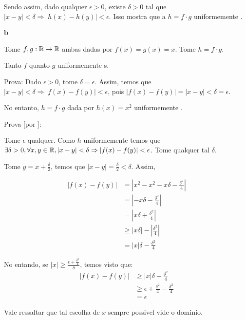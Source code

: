Sendo assim, dado qualquer $\epsilon > 0$, existe $\delta > 0$ tal que \mbox{$|x-y| < \delta \Rightarrow |h(x)-h(y)|<\epsilon$}. Isso mostra que a \funcao $h = f\cdot g$ \eh uniformemente \continua.

\textbf{b}

Tome $f,g:\mathbb{R}\rightarrow\mathbb{R}$ ambas dadas por $f(x) = g(x) = x$. Tome $h = f\cdot g$.

Tanto $f$ quanto $g$ \sao uniformemente \continua s.

Prova: Dado $\epsilon > 0$, tome $\delta = \epsilon$. Assim, temos que $|x - y| < \delta \Rightarrow |f(x) - f(y)| < \epsilon$, pois $|f(x) - f(y)| = |x - y| < \delta = \epsilon$.

No entanto, $h = f \cdot g$ dada por $h(x) = x^2$ \nao \eh uniformemente \continua.

Prova [por \contradicao]:

Tome $\epsilon$ qualquer. Como $h$ uniformemente \continua temos que $\exists \delta > 0, \forall x,y \in \mathbb{R}, |x-y| < \delta \Rightarrow |f(x)-f(y)| < \epsilon$. Tome qualquer tal $\delta$.

Tome $y = x + \frac{\delta}{2}$, temos que $|x-y| = \frac{\delta}{2} < \delta$. Assim, 

\begin{align*}
	|f(x) - f(y)| &= |x^2 - x^2 - x\delta - \frac{\delta^2}{4}| \\
	&= |- x\delta - \frac{\delta^2}{4}| \\
	&= |x\delta + \frac{\delta^2}{4}| \\
	&\ge |x\delta| - |\frac{\delta^2}{4}| \\
	&= |x|\delta - \frac{\delta^2}{4}
\end{align*}

No entando, se $|x| \ge  \frac{\epsilon + \frac{\delta^2}{4}}{\delta}$, temos \contradicao visto que:
\begin{align*}
	|f(x) - f(y)| &\ge |x|\delta - \frac{\delta^2}{4} \\
	&\ge \epsilon + \frac{\delta^2}{4} - \frac{\delta^2}{4} \\
	&= \epsilon
\end{align*}

Vale ressaltar que tal escolha de $x$ \eh sempre possivel vide o dominio.



